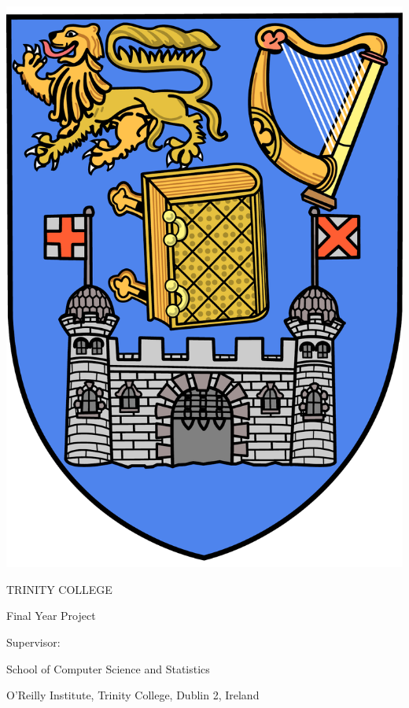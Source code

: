 \thispagestyle{empty}

{
  \centering

  \sffamily

  \vspace{10pt}

  \includegraphics[scale=0.12]{tcd/trinitycollege.pdf}

  \vspace{10pt}

  {\Huge TRINITY COLLEGE}

  \vspace{80pt}

  \textbf{ \Large \emph \projecttitle}

  \vspace{30pt}

  \authorname

  \degreetitle

  Final Year Project \datenospace

  Supervisor: \supervisorname

  \vspace{130pt}

  \large{
    School of Computer Science and Statistics

    O'Reilly Institute, Trinity College, Dublin 2, Ireland
  }

}

